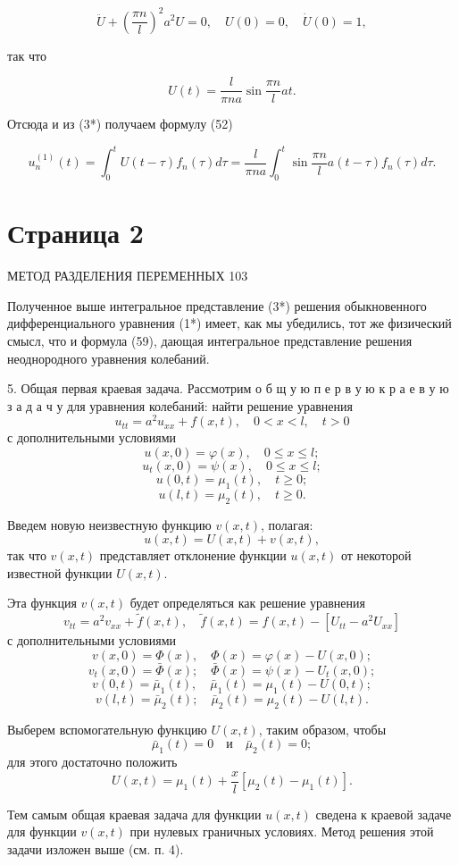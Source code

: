 \documentclass{article}
\begin{document}
\[
\ddot{U} + \left( \frac{\pi n}{l} \right)^2 a^2 U = 0, \quad U(0) = 0, \quad \dot{U}(0) = 1,
\]

так что

\[
U(t) = \frac{l}{\pi n a} \sin \frac{\pi n}{l} a t.
\]

Отсюда и из (3*) получаем формулу (52)

\[
u_n^{(1)} (t) = \int_0^t U \left( t - \tau \right) f_n (\tau) d\tau = \frac{l}{\pi n a} \int_0^t \sin \frac{\pi n}{l} a \left( t - \tau \right) f_n (\tau) d\tau.
\]

\section*{Страница 2}

МЕТОД РАЗДЕЛЕНИЯ ПЕРЕМЕННЫХ 103

Полученное выше интегральное представление (3*) решения обыкновенного дифференциального уравнения (1*) имеет, как мы убедились, тот же физический смысл, что и формула (59), дающая интегральное представление решения неоднородного уравнения колебаний.

5. Общая первая краевая задача. Рассмотрим о б щ у ю п е р в у ю к р а е в у ю з а д а ч у для уравнения колебаний:
найти решение уравнения
\[
u_{tt} = a^2 u_{xx} + f(x, t), \quad 0 < x < l, \quad t > 0
\]
с дополнительными условиями
\[
u(x, 0) = \varphi(x), \quad 0 \leq x \leq l;
\]
\[
u_t(x, 0) = \psi(x), \quad 0 \leq x \leq l;
\]
\[
u(0, t) = \mu_1(t), \quad t \geq 0;
\]
\[
u(l, t) = \mu_2(t), \quad t \geq 0.
\]

Введем новую неизвестную функцию $v(x, t)$, полагая:
\[
u(x, t) = U(x, t) + v(x, t),
\]
так что $v(x, t)$ представляет отклонение функции $u(x, t)$ от некоторой известной функции $U(x, t)$.

Эта функция $v(x, t)$ будет определяться как решение уравнения
\[
v_{tt} = a^2 v_{xx} + \tilde{f}(x, t), \quad \tilde{f}(x, t) = f(x, t) - [U_{tt} - a^2 U_{xx}]
\]
с дополнительными условиями
\[
v(x, 0) = \Phi(x), \quad \Phi(x) = \varphi(x) - U(x, 0);
\]
\[
v_t(x, 0) = \bar{\Phi}(x); \quad \bar{\Phi}(x) = \psi(x) - U_t(x, 0);
\]
\[
v(0, t) = \bar{\mu}_1(t), \quad \bar{\mu}_1(t) = \mu_1(t) - U(0, t);
\]
\[
v(l, t) = \bar{\mu}_2(t); \quad \bar{\mu}_2(t) = \mu_2(t) - U(l, t).
\]

Выберем вспомогательную функцию $U(x, t)$, таким образом, чтобы
\[
\bar{\mu}_1(t) = 0 \quad \text{и} \quad \bar{\mu}_2(t) = 0;
\]
для этого достаточно положить
\[
U(x, t) = \mu_1(t) + \frac{x}{l} [\mu_2(t) - \mu_1(t)].
\]

Тем самым общая краевая задача для функции $u(x, t)$ сведена к краевой задаче для функции $v(x, t)$ при нулевых граничных условиях. Метод решения этой задачи изложен выше (см. п. 4).
\end{document}
